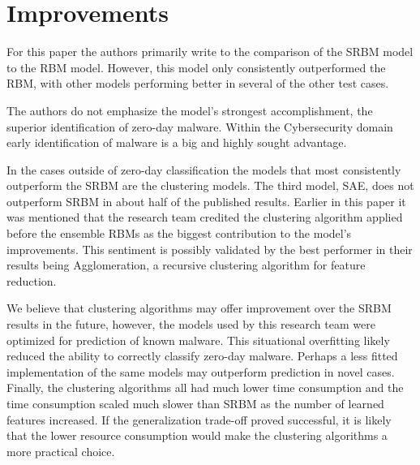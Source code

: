 \documentclass[]{article}
\begin{document}
\section{Improvements}

For this paper the authors primarily write to the comparison of the SRBM model to the RBM model.
However, this model only consistently outperformed the RBM, with other models performing better in several of the other test cases.

The authors do not emphasize the model's strongest accomplishment, the superior identification of zero-day malware. 
Within the Cybersecurity domain early identification of malware is a big and highly sought advantage.

In the cases outside of zero-day classification the models that most consistently outperform the SRBM are the clustering models.
The third model, SAE, does not outperform SRBM in about half of the published results.
Earlier in this paper it was mentioned that the research team credited the clustering algorithm applied before the ensemble RBMs as the biggest contribution to the model's improvements.
This sentiment is possibly validated by the best performer in their results being Agglomeration, a recursive clustering algorithm for feature reduction.

We believe that clustering algorithms may offer improvement over the SRBM results in the future, however, the models used by this research team were optimized for prediction of known malware.
This situational overfitting likely reduced the ability to correctly  classify zero-day malware.
Perhaps a less fitted implementation of the same models may outperform prediction in novel cases.
Finally, the clustering algorithms all had much lower time consumption and the time consumption scaled much slower than SRBM as the number of learned features increased.
If the generalization trade-off proved successful, it is likely that the lower resource consumption would make the clustering algorithms a more practical choice.

\clearpage


\end{document}
